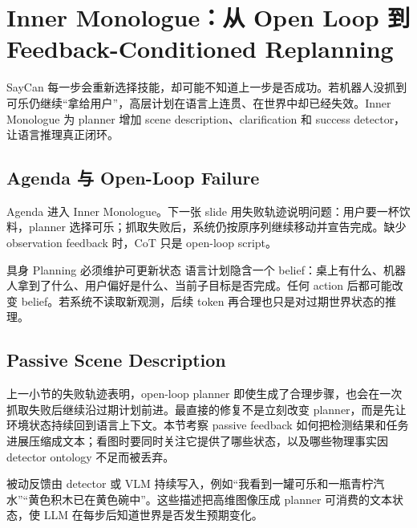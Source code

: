 \section{Inner Monologue：从 Open Loop 到 Feedback-Conditioned Replanning}

SayCan 每一步会重新选择技能，却可能不知道上一步是否成功。若机器人没抓到可乐仍继续“拿给用户”，高层计划在语言上连贯、在世界中却已经失效。Inner Monologue 为 planner 增加 scene description、clarification 和 success detector，让语言推理真正闭环。

\subsection{Agenda 与 Open-Loop Failure}

Agenda 进入 Inner Monologue。下一张 slide 用失败轨迹说明问题：用户要一杯饮料，planner 选择可乐；抓取失败后，系统仍按原序列继续移动并宣告完成。缺少 observation feedback 时，CoT 只是 open-loop script。



\begin{importantbox}{具身 Planning 必须维护可更新状态}
语言计划隐含一个 belief：桌上有什么、机器人拿到了什么、用户偏好是什么、当前子目标是否完成。任何 action 后都可能改变 belief。若系统不读取新观测，后续 token 再合理也只是对过期世界状态的推理。
\end{importantbox}

\subsection{Passive Scene Description}

上一小节的失败轨迹表明，open-loop planner 即使生成了合理步骤，也会在一次抓取失败后继续沿过期计划前进。最直接的修复不是立刻改变 planner，而是先让环境状态持续回到语言上下文。本节考察 passive feedback 如何把检测结果和任务进展压缩成文本；看图时要同时关注它提供了哪些状态，以及哪些物理事实因 detector ontology 不足而被丢弃。

被动反馈由 detector 或 VLM 持续写入，例如“我看到一罐可乐和一瓶青柠汽水”“黄色积木已在黄色碗中”。这些描述把高维图像压成 planner 可消费的文本状态，使 LLM 在每步后知道世界是否发生预期变化。

